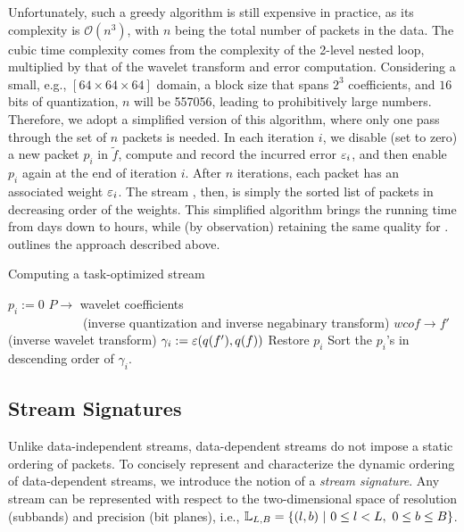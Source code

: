 Unfortunately, such a greedy algorithm is still expensive in practice, as its complexity is
$\mathcal{O}(n^3)$, with $n$ being the total number of packets in the data. The cubic time
complexity comes from the complexity of the 2-level nested loop, multiplied by that of the wavelet
transform and error computation. Considering a small, e.g., $[64 \times 64 \times 64]$ domain, a
block size that spans $2^3$ coefficients, and $16$ bits of quantization, $n$ will be 557056, leading
to prohibitively large numbers. Therefore, we adopt a simplified version of this algorithm, where
only one pass through the set of $n$ packets is needed. In each iteration $i$, we disable (set to
zero) a new packet $p_i$ in $\tilde{f}$, compute and record the incurred error $\err_i$, and then
enable $p_i$ again at the end of iteration $i$. After $n$ iterations, each packet has an associated
weight $\err_i$. The stream \sopt, then, is simply the sorted list of packets in decreasing order
of the weights. This simplified algorithm brings the running time from days down to hours, while (by
observation) retaining the same quality for \sopt.  outlines the approach
described above.

\begin{algorithm}[h]
  \caption{Computing a task-optimized stream}
  \begin{algorithmic}[1]
			\State $p_i := 0$
      \State $P \rightarrow$ wavelet coefficients \wcof \\
      		\ \ \ \ \ \ \ \ \ \ \ \ (inverse quantization and inverse negabinary transform)
			\State $wcof \rightarrow f'$ (inverse wavelet transform)
			\State $\gamma_i := \err(q(f'),q(f))$			
			\State Restore $p_i$
		\EndFor
		\State Sort the $p_i$'s in descending order of $\gamma_i$.
	\end{algorithmic}
	\label{alg:greedy}
\end{algorithm}

\subsection{Stream Signatures} \label{sec:stream-signature}
Unlike data-independent streams, data-dependent streams do not impose a static ordering of packets.
To concisely represent and characterize the dynamic ordering of data-dependent streams, we introduce
the notion of a \emph{stream signature}. Any stream can be represented with respect to the
two-dimensional space of resolution (subbands) and precision (bit planes), i.e., \mbox{$
{\mathbb L}_{L,B}=\{(l,b)\ |\ 0\leq l < L,\ 0\leq b \leq B\}$.}

